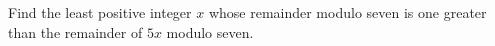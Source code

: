 Find the least positive integer $x$ whose remainder modulo seven is one greater than the remainder of $5x$ modulo seven.
